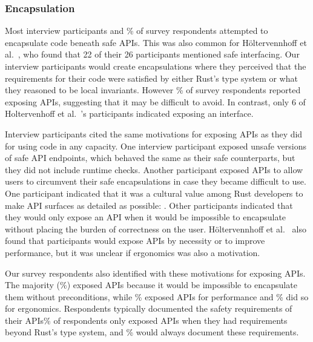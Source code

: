{\subsubsection{Encapsulation}
Most interview participants and \%
of survey respondents attempted to encapsulate \unsafe code beneath safe APIs. This was also common for Höltervennhoff et al.~\cite{holtervennhoff23}, who found that 22 of their 26 participants mentioned safe interfacing. Our interview participants would create encapsulations where they perceived that the requirements for their \unsafe code were satisfied by either Rust's type system or what they reasoned to be local invariants. However \% of survey respondents reported exposing \unsafe APIs, suggesting that it may be difficult to avoid. In contrast, only 6 of Holtervenhoff et al.~\cite{holtervennhoff23}'s participants indicated exposing an \unsafe interface.

Interview participants cited the same motivations for exposing \unsafe APIs as they did for using \unsafe code in any capacity. One interview participant exposed unsafe versions of safe API endpoints, which behaved the same as their safe counterparts, but they did not include runtime checks. Another participant exposed \unsafe APIs to allow users to circumvent their safe encapsulations in case they became difficult to use. One participant indicated that it was a cultural value among Rust developers to make API surfaces as detailed as possible: . Other participants indicated that they would only expose an \unsafe API when it would be impossible to encapsulate without placing the burden of correctness on the user. Höltervennhoff et al.~\cite{holtervennhoff23} also found that participants would expose \unsafe APIs by necessity or to improve performance, but it was unclear if ergonomics was also a motivation.

Our survey respondents also identified with these motivations for exposing \unsafe APIs. The majority (\%) exposed \unsafe APIs because it would be impossible to encapsulate them without preconditions, while \% exposed \unsafe APIs for performance and \% did so for ergonomics. Respondents typically documented the safety requirements of their \unsafe APIs\textemdash {}\% of respondents only exposed \unsafe APIs when they had requirements beyond Rust's type system, and \% would always document these requirements.

}

